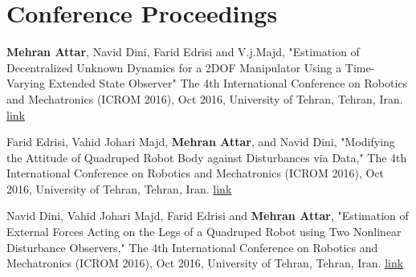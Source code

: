 \documentclass[letterpaper,10.8pt]{article}
\begin{document}
\section{Conference Proceedings}
\begin{enumerate}[label={[\arabic*]}]
  \item \textbf{Mehran Attar}, Navid Dini, Farid Edrisi and V.j.Majd, "Estimation of Decentralized Unknown Dynamics
for a 2DOF Manipulator Using a Time-Varying Extended State Observer" The 4th International
Conference on Robotics and Mechatronics (ICROM 2016), Oct 2016, University of Tehran, Tehran, Iran. \href{https://ieeexplore.ieee.org/document/7886827}{link}
  \item Farid Edrisi, Vahid Johari Majd, \textbf{Mehran Attar}, and Navid Dini, "Modifying the Attitude of Quadruped
Robot Body against Disturbances via Data," The 4th International Conference on Robotics and
Mechatronics (ICROM 2016), Oct 2016, University of Tehran, Tehran, Iran. \href{https://ieeexplore.ieee.org/document/7886817}{link}
%
\item Navid Dini, Vahid Johari Majd, Farid Edrisi and \textbf{Mehran Attar}, "Estimation of External Forces Acting on
the Legs of a Quadruped Robot using Two Nonlinear Disturbance Observers," The 4th International
Conference on Robotics and Mechatronics (ICROM 2016), Oct 2016, University of Tehran, Tehran, Iran. \href{https://ieeexplore.ieee.org/document/7886820}{link}
\end{enumerate}
\end{document}
